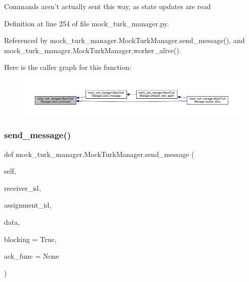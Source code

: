 \begin{DoxyVerb}Commands aren't actually sent this way, as state updates are read\end{DoxyVerb}
 

Definition at line 254 of file mock\+\_\+turk\+\_\+manager.\+py.



Referenced by mock\+\_\+turk\+\_\+manager.\+Mock\+Turk\+Manager.\+send\+\_\+message(), and mock\+\_\+turk\+\_\+manager.\+Mock\+Turk\+Manager.\+worker\+\_\+alive().

Here is the caller graph for this function\+:
\nopagebreak
\begin{figure}[H]
\begin{center}
\leavevmode
\includegraphics[width=350pt]{classmock__turk__manager_1_1MockTurkManager_a449a0fd9facd766c52565185f2f26054_icgraph}
\end{center}
\end{figure}
\mbox{\label{classmock__turk__manager_1_1MockTurkManager_a06ee464221ed467a72172cb19352e6eb}} 
\subsubsection{\texorpdfstring{send\+\_\+message()}{send\_message()}}
{\footnotesize\ttfamily def mock\+\_\+turk\+\_\+manager.\+Mock\+Turk\+Manager.\+send\+\_\+message (\begin{DoxyParamCaption}\item[{}]{self,  }\item[{}]{receiver\+\_\+id,  }\item[{}]{assignment\+\_\+id,  }\item[{}]{data,  }\item[{}]{blocking = {\ttfamily True},  }\item[{}]{ack\+\_\+func = {\ttfamily None} }\end{DoxyParamCaption})}

